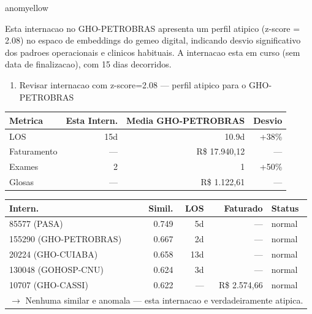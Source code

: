 \documentclass[a4paper,10pt]{article}
\begin{document}
\begin{anomalycard}[Internacao 168076 | GHO-PETROBRAS | MODERADO (z=2.08)]{anomyellow}
\vspace{2pt}\begin{tcolorbox}[colback=severityred!20,colframe=anomyellow,title={\textbf{Interpretacao de Negocio}},fonttitle=\bfseries\small,left=4pt,right=4pt,top=3pt,bottom=3pt]
{\small Esta internacao no GHO-PETROBRAS apresenta um perfil atipico (z-score = 2.08) no espaco de embeddings do gemeo digital, indicando desvio significativo dos padroes operacionais e clinicos habituais. A internacao esta em curso (sem data de finalizacao), com 15 dias decorridos.}
\end{tcolorbox}
\begin{tcolorbox}[colback=severityyellow!30,colframe=anomorange,title={\textbf{Recomendacoes Especificas}},fonttitle=\bfseries\small,left=4pt,right=4pt,top=3pt,bottom=3pt]
\begin{enumerate}[nosep,leftmargin=16pt]
\item {\small Revisar internacao com z-score=2.08 --- perfil atipico para o GHO-PETROBRAS}
\end{enumerate}
\end{tcolorbox}
\begin{center}\begin{tabular}{l r r r}\toprule\textbf{Metrica} & \textbf{Esta Intern.} & \textbf{Media GHO-PETROBRAS} & \textbf{Desvio} \\\midrule
LOS & 15d & 10.9d & +38\% \\
Faturamento & --- & R\$ 17.940,12 & --- \\
Exames & 2 & 1 & \textcolor{anomorange}{+50\%} \\
Glosas & --- & R\$ 1.122,61 & --- \\
\bottomrule\end{tabular}\end{center}

\begin{tabular}{l r r r l}\toprule\textbf{Intern.} & \textbf{Simil.} & \textbf{LOS} & \textbf{Faturado} & \textbf{Status} \\\midrule
85577 (PASA) & 0.749 & 5d & --- & \textcolor{jcubeblue}{normal} \\
155290 (GHO-PETROBRAS) & 0.667 & 2d & --- & \textcolor{jcubeblue}{normal} \\
20224 (GHO-CUIABA) & 0.658 & 13d & --- & \textcolor{jcubeblue}{normal} \\
130048 (GOHOSP-CNU) & 0.624 & 3d & --- & \textcolor{jcubeblue}{normal} \\
10707 (GHO-CASSI) & 0.622 & --- & R\$ 2.574,66 & \textcolor{jcubeblue}{normal} \\
\multicolumn{5}{l}{\textcolor{jcubeblue}{\small $\rightarrow$ Nenhuma similar e anomala --- esta internacao e verdadeiramente atipica.}} \\
\bottomrule\end{tabular}


\end{anomalycard}
\end{document}

